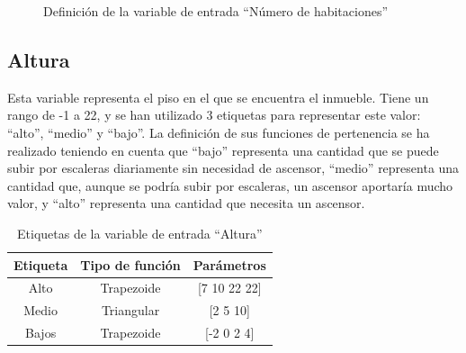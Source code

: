 \documentclass[12pt]{report} %
\begin{document}
        \begin{figure}[H]
            \centering
            \caption{Definición de la variable de entrada ``Número de habitaciones''}
        \end{figure}

        \subsection{Altura}
        Esta variable representa el piso en el que se encuentra el inmueble.
        Tiene un rango de -1 a 22, y se han utilizado 3 etiquetas para representar este valor: ``alto'', ``medio'' y ``bajo''.
        La definición de sus funciones de pertenencia se ha realizado teniendo en cuenta que ``bajo'' representa una cantidad que se puede subir por escaleras diariamente sin necesidad de ascensor,
        ``medio'' representa una cantidad que, aunque se podría subir por escaleras, un ascensor aportaría mucho valor, y ``alto'' representa una cantidad que necesita un ascensor.

        \begin{table}[h]
            \center
            \begin{tabular}{@{}ccc@{}}
                \toprule
                \textbf{Etiqueta} & \textbf{Tipo de función} & \textbf{Parámetros} \\
                \midrule
                Alto  & Trapezoide & [7 10 22 22] \\
                Medio & Triangular & [2 5 10]     \\
                Bajos & Trapezoide & [-2 0 2 4]   \\
                \bottomrule
            \end{tabular}
            \caption{Etiquetas de la variable de entrada ``Altura''}
        \end{table}
\end{document}
